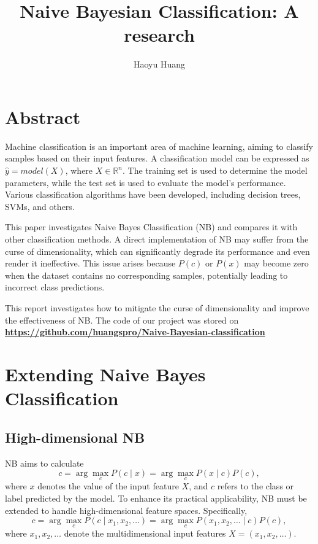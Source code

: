 \documentclass[10pt,a4paper]{article}
\title{Naive Bayesian Classification: A research}
\author{Haoyu Huang}
\begin{document}
	
	\maketitle
	\newpage
	\tableofcontents
	\newpage
	
	\section{Abstract}
	
	Machine classification is an important area of machine learning, aiming to classify samples based on their input features. A classification model can be expressed as
	$\hat{y} = model(X)$, where $X \in \mathbb{R}^n$.
	The training set is used to determine the model parameters, while the test set is used to evaluate the model's performance. Various classification algorithms have been developed, including decision trees, SVMs, and others.
	
	This paper investigates Naive Bayes Classification (NB) and compares it with other classification methods. A direct implementation of NB may suffer from the curse of dimensionality, which can significantly degrade its performance and even render it ineffective. This issue arises because $P(c)$ or $P(x)$ may become zero when the dataset contains no corresponding samples, potentially leading to incorrect class predictions.
	
	This report investigates how to mitigate the curse of dimensionality and improve the effectiveness of NB. The code of our project was stored on \textbf{\url{https://github.com/huangspro/Naive-Bayesian-classification}}
	
	
	\section{Extending Naive Bayes Classification}
	
	\subsection{High-dimensional NB}
	
	NB aims to calculate
	\[
	c = \arg\max_c P(c \mid x)
	= \arg\max_c P(x \mid c)P(c),
	\]
	where $x$ denotes the value of the input feature $X$, and $c$ refers to the class or label predicted by the model. To enhance its practical applicability, NB must be extended to handle high-dimensional feature spaces. Specifically,
	\[
	c = \arg\max_c P(c \mid x_1, x_2, \ldots)
	= \arg\max_c P(x_1, x_2, \ldots \mid c)P(c),
	\]
	where $x_1, x_2, \ldots$ denote the multidimensional input features
	$X = (x_1, x_2, \ldots)$.
	
\end{document}
